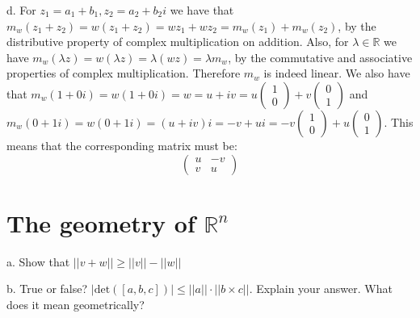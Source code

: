 \begin{solution}
    d. For $z_1 = a_1 + b_1, z_2 = a_2 + b_2i$ we have that $m_w(z_1+z_2) = w(z_1+z_2) = wz_1 + wz_2 = m_w(z_1) + m_w(z_2)$, by the distributive property of complex multiplication on addition. Also, for $\lambda \in \mathbb{R}$ we have $m_w(\lambda z) = w(\lambda z) = \lambda(w z) = \lambda m_w$, by the commutative and associative properties of complex multiplication. Therefore $m_w$ is indeed linear. We also have that $m_w(1+0i) = w(1+0i) = w = u + iv = u\begin{pmatrix} 1 \\ 0 \end{pmatrix} + v\begin{pmatrix} 0 \\ 1
    \end{pmatrix}$ and $m_w(0+1i) = w(0+1i) = (u+iv)i = -v + ui = -v\begin{pmatrix} 1 \\ 0 \end{pmatrix} + u\begin{pmatrix} 0 \\ 1 \end{pmatrix}$. This means that the corresponding matrix must be:
    $$\begin{pmatrix}
        u & -v \\ v & u
    \end{pmatrix}$$
\end{solution}

\section{The geometry of \texorpdfstring{$\mathbb{R}^n$}{placeholder}}

\begin{exercise}{12}
    a. Show that $\lvert \lvert v + w \rvert \rvert \geq \lvert \lvert v \rvert \rvert - \lvert \lvert w \rvert \rvert$

    b. True or false? $\lvert \text{det}([a, b, c]) \rvert \leq \lvert \lvert a \rvert \rvert \cdot \lvert \lvert b \times c \rvert \rvert$. Explain your answer. What does it mean geometrically?
\end{exercise}

